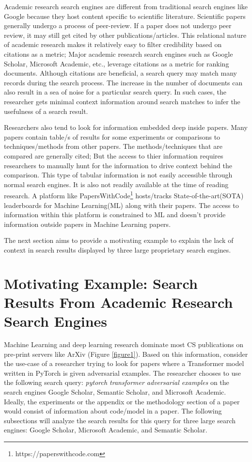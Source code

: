 Academic research search engines are different from traditional search engines like Google because they host content specific to scientific literature. 
Scientific papers generally undergo a process of peer-review. If a paper does not undergo peer review, it may still get cited by other publications/articles. This relational nature of academic research makes it relatively easy to filter credibility based on citations as a metric; Major academic research search engines such as Google Scholar, Microsoft Academic, etc., leverage citations as a metric for ranking documents. Although citations are beneficial, a search query may match many records during the search process. The increase in the number of documents can also result in a sea of noise for a particular search query. In such cases, the researcher gets minimal context information around search matches to infer the usefulness of a search result. 

Researchers also tend to look for information embedded deep inside papers. Many papers contain table/s of results for some experiments or comparisons to techniques/methods from other papers. The methods/techniques that are compared are generally cited; But the access to thier information requires researchers to manually hunt for the information to drive context behind the comparison. This type of tabular information is not easily accessible through normal search engines. It is also not readily available at the time of reading research. A platform like PapersWithCode\footnote{https://paperswithcode.com} hosts/tracks State-of-the-art(SOTA) leaderboards for Machine Learning(ML) along with their papers. The access to information within this platform is constrained to ML and doesn't provide information outside papers in Machine Learning papers. 

The next section aims to provide a motivating example to explain the lack of context in search results displayed by three large proprietary search engines.

\section{Motivating Example: Search Results From Academic Research Search Engines}
Machine Learning and deep learning research dominate most CS publications on pre-print servers like ArXiv (Figure \ref{figure1}).
Based on this information, consider the use-case of a researcher trying to look for papers where a Transformer\parencite{vaswani2017attention} model written in PyTorch\parencite{paszke2019pytorch} is given adversarial examples. 
The researcher chooses to use the following search query: \textit{pytorch transformer adversarial examples} on the search engines Google Scholar, Semantic Scholar, and Microsoft Academic. 
Ideally, the experiments or the appendix or the methodology section of a paper would consist of information about code/model in a paper. 
The following subsections will analyze the search results for this query for three large search engines: Google Scholar, Microsoft Academic, and Semantic Scholar. 
\pagebreak

